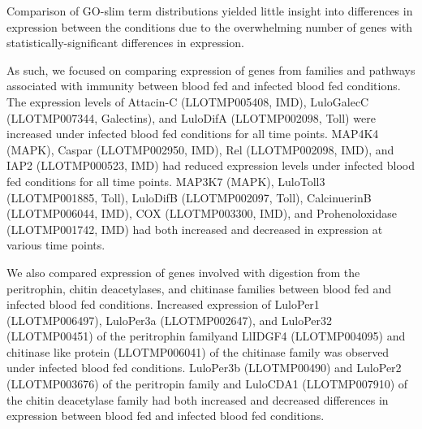 Comparison of GO-slim term distributions yielded little insight into differences in expression between the conditions due to the overwhelming number of genes with statistically-significant differences in expression.

As such, we focused on comparing expression of genes from families and pathways associated with immunity between blood fed and infected blood fed conditions.  The expression levels of Attacin-C (LLOTMP005408, IMD), LuloGalecC (LLOTMP007344, Galectins), and LuloDifA (LLOTMP002098, Toll) were increased under infected blood fed conditions for all time points.  MAP4K4 (MAPK), Caspar (LLOTMP002950, IMD), Rel (LLOTMP002098, IMD), and IAP2 (LLOTMP000523, IMD) had reduced expression levels under infected blood fed conditions for all time points.  MAP3K7 (MAPK), LuloToll3 (LLOTMP001885, Toll), LuloDifB (LLOTMP002097, Toll), CalcinuerinB (LLOTMP006044, IMD), COX (LLOTMP003300, IMD), and Prohenoloxidase (LLOTMP001742, IMD) had both increased and decreased in expression at various time points.

We also compared expression of genes involved with digestion from the peritrophin, chitin deacetylases, and chitinase families between blood fed and infected blood fed conditions. Increased expression of LuloPer1 (LLOTMP006497), LuloPer3a (LLOTMP002647), and LuloPer32 (LLOTMP00451) of the peritrophin familyand LlIDGF4 (LLOTMP004095) and chitinase like protein (LLOTMP006041) of the chitinase family was observed under infected blood fed conditions.  LuloPer3b (LLOTMP00490) and LuloPer2 (LLOTMP003676) of the peritropin family and LuloCDA1 (LLOTMP007910) of the chitin deacetylase family had both increased and decreased differences in expression between blood fed and infected blood fed conditions.

